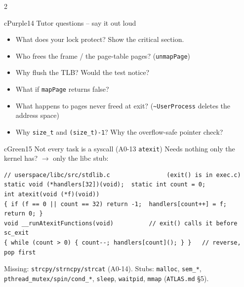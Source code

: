 \documentclass[10pt,a4paper,landscape]{article}
\newcommand{\cc}[1]{\texttt{#1}}   %
\begin{document}
\begin{multicols}{2}
\begin{csec}{cPurple}{14 \quad Tutor questions -- say it out loud}
\begin{itemize}
  \item What does your lock protect? Show the critical section.
  \item Who frees the frame / the page-table pages? (\cc{unmapPage})
  \item Why flush the TLB? Would the test notice?
  \item What if \cc{mapPage} returns false?
  \item What happens to pages never freed at exit? (\cc{\textasciitilde UserProcess} deletes the address space)
  \item Why \cc{size\_t} and \cc{(size\_t)-1}? Why the overflow-safe pointer check?
\end{itemize}
\end{csec}

\begin{csec}{cGreen}{15 \quad Not every task is a syscall (A0-13 \texttt{atexit})}
Needs nothing only the kernel has? $\to$ only the libc stub:
\begin{lstlisting}
// userspace/libc/src/stdlib.c                (exit() is in exec.c)
static void (*handlers[32])(void);  static int count = 0;
int atexit(void (*f)(void))
{ if (f == 0 || count == 32) return -1;  handlers[count++] = f;  return 0; }
void __runAtexitFunctions(void)          // exit() calls it before sc_exit
{ while (count > 0) { count--; handlers[count](); } }   // reverse, pop first
\end{lstlisting}
Missing: \cc{strcpy/strncpy/strcat} (A0-14). Stubs: \cc{malloc}, \cc{sem\_*}, \cc{pthread\_mutex/spin/cond\_*}, \cc{sleep}, \cc{waitpid}, \cc{mmap} (\cc{ATLAS.md} \S 5).
\end{csec}

\end{multicols}
\end{document}
